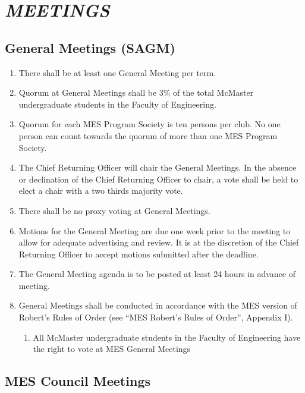 \hypertarget{meetings}{%
 \section{\texorpdfstring{\emph{MEETINGS}}{MEETINGS}}
 \label{meetings}}

\hypertarget{general-meetings-sagm}{%
 \subsection{General Meetings (SAGM)}
 \label{general-meetings-sagm}}
\begin{enumerate}
 \item
  There shall be at least one General Meeting per term.
 \item
  Quorum at General Meetings shall be 3\% of the total McMaster
  undergraduate students in the Faculty of Engineering.
 \item
  Quorum for each MES Program Society is ten persons per club. No one
  person can count towards the quorum of more than one MES Program
  Society.
 \item
  The Chief Returning Officer will chair the General Meetings. In the
  absence or declination of the Chief Returning Officer to chair, a vote
  shall be held to elect a chair with a two thirds majority vote.
 \item
  There shall be no proxy voting at General Meetings.
 \item
  Motions for the General Meeting are due one week prior to the meeting
  to allow for adequate advertising and review. It is at the discretion
  of the Chief Returning Officer to accept motions submitted after the
  deadline.
 \item
  The General Meeting agenda is to be posted at least 24 hours in
  advance of meeting.
 \item
  General Meetings shall be conducted in accordance with the MES version
  of Robert's Rules of Order (see ``MES Robert's Rules of Order'',
  Appendix I).

  \begin{enumerate}
   \item
    All McMaster undergraduate students in the Faculty of Engineering
    have the right to vote at MES General Meetings
  \end{enumerate}
\end{enumerate}

\hypertarget{mes-council-meetings}{%
 \subsection{MES Council Meetings}
 \label{mes-council-meetings}}

